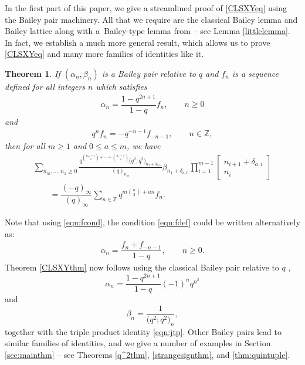 \documentclass[pdftex]{sigma}
\newtheorem{Theorem}{Theorem}[section]
\numberwithin{equation}{section}
\newcommand{\ZZ}{\mathbb{Z}}
\begin{document}
In the first part of this paper, we give a streamlined proof of \eqref{CLSXYeq} using the Bailey pair machinery. All that we require are the classical Bailey lemma and Bailey lattice along with a~Bailey-type lemma from \cite{Lo1} -- see Lemma \ref{littlelemma}. In fact, we establish a much more general result, which allows us to prove \eqref{CLSXYeq} and many more families of identities like it.
\begin{Theorem}
	\label{thm:main}
	If $(\alpha_n,\beta_n)$ is a Bailey pair relative to $q$ and $f_n$ is a sequence defined for all integers $n$ which satisfies
	\begin{align} \label{eqn:fdef}
		\alpha_n=\dfrac{1-q^{2n+1}}{1-q}f_n,\qquad n\geq 0
	\end{align}
	and
	\begin{align}
		q^{n}f_n = -q^{-n-1}f_{-n-1}, \qquad n\in \ZZ,
		\label{eqn:fcond}
	\end{align}
	then for all $m \geq 1$ and $0 \leq a \leq m$, we have
	\begin{gather}
			\sum_{n_m, \dots, n_1 \geq 0} \frac{q^{\binom{n_m+1}{2} + \cdots + \binom{n_1+1}{2}}\bigl(q^2;q^2\bigr)_{n_1+\delta_{a,0}}}{(q)_{n_m}} \beta_{n_1+\delta_{a,0}} \prod_{i=1}^{m-1} \begin{bmatrix} n_{i+1} + \delta_{a,i} \\ n_i \end{bmatrix}\nonumber \\
			\qquad{}= \dfrac{(-q)_\infty}{(q)_\infty}
			\sum_{n\in\ZZ}
			q^{m\binom{n}{2}+an}f_n.\label{eqn:mainid}
	\end{gather}
\end{Theorem}
Note that using \eqref{eqn:fcond}, the condition \eqref{eqn:fdef} could be written alternatively as:
\begin{align*}
	\alpha_n=\dfrac{f_n+f_{-n-1}}{1-q},\qquad n\geq 0.
\end{align*}
Theorem \ref{CLSXYthm} now follows using the classical Bailey pair relative to $q$ \cite[E(3)]{Sl1},
\begin{equation} \label{seed1alpha}
	\alpha_n = \frac{1-q^{2n+1}}{1-q}(-1)^nq^{n^2}
\end{equation}
and
\begin{equation} \label{seed1beta}
	\beta_n = \frac{1}{\bigl(q^2;q^2\bigr)_n},
\end{equation}
together with the triple product identity \eqref{eqn:jtp}. Other Bailey pairs lead to similar families of identities, and we give a number of examples in Section \ref{sec:mainthm} -- see Theorems \ref{q^2thm}, \ref{strangesignthm}, and \ref{thm:quintuple}.
\end{document}
